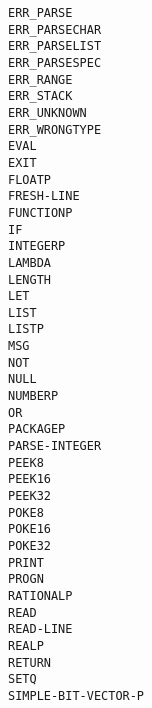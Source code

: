 \documentclass[10pt, openany]{book}
\newcommand{\keyword}[1]{\texttt{#1}}
\begin{document}
\begin{multicols}{4}
  \keyword{ERR\_PARSE}\\
  \keyword{ERR\_PARSECHAR}\\
  \keyword{ERR\_PARSELIST}\\
  \keyword{ERR\_PARSESPEC}\\
  \keyword{ERR\_RANGE}\\
  \keyword{ERR\_STACK}\\
  \keyword{ERR\_UNKNOWN}\\
  \keyword{ERR\_WRONGTYPE}\\
  \keyword{EVAL}\\
  \keyword{EXIT}\\
  \keyword{FLOATP}\\
  \keyword{FRESH-LINE}\\
  \keyword{FUNCTIONP}\\
  \keyword{IF}\\
  \keyword{INTEGERP}\\
  \keyword{LAMBDA}\\
  \keyword{LENGTH}\\
  \keyword{LET}\\
  \keyword{LIST}\\
  \keyword{LISTP}\\
  \keyword{MSG}\\
  \keyword{NOT}\\
  \keyword{NULL}\\
  \keyword{NUMBERP}\\
  \keyword{OR}\\
  \keyword{PACKAGEP}\\
  \keyword{PARSE-INTEGER}\\
  \keyword{PEEK8}\\
  \keyword{PEEK16}\\
  \keyword{PEEK32}\\
  \keyword{POKE8}\\
  \keyword{POKE16}\\
  \keyword{POKE32}\\
  \keyword{PRINT}\\
  \keyword{PROGN}\\
  \keyword{RATIONALP}\\
  \keyword{READ}\\
  \keyword{READ-LINE}\\
  \keyword{REALP}\\
  \keyword{RETURN}\\
  \keyword{SETQ}\\
  \keyword{SIMPLE-BIT-VECTOR-P}\\

\end{multicols}
\end{document}
